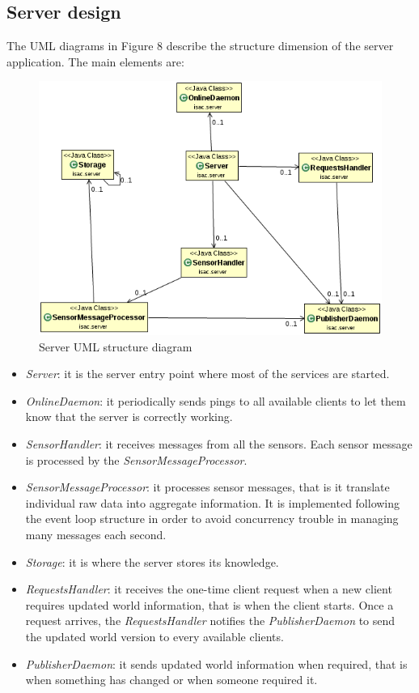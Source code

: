 \documentclass[11pt]{article}
\begin{document}
\subsection{Server design}
The UML diagrams in Figure 8 describe the structure dimension of the server application. The main elements are:
\begin{figure}
  \centering
	\includegraphics[scale=0.65]{serverUML}
  \caption{Server UML structure diagram}
\end{figure}
\begin{itemize}
\item \emph{Server}: it is the server entry point where most of the services are started.
\item \emph{OnlineDaemon}: it periodically sends pings to all available clients to let them know that the server is correctly working.
\item \emph{SensorHandler}: it receives messages from all the sensors. Each sensor message is processed by the \emph{SensorMessageProcessor}.
\item \emph{SensorMessageProcessor}: it processes sensor messages, that is it translate individual raw data into aggregate information. It is implemented following the event loop structure in order to avoid concurrency trouble in managing many messages each second.
\item \emph{Storage}: it is where the server stores its knowledge.
\item \emph{RequestsHandler}: it receives the one-time client request when a new client requires updated world information, that is when the client starts. Once a request arrives, the \emph{RequestsHandler} notifies the \emph{PublisherDaemon} to send the updated world version to every available clients.
\item \emph{PublisherDaemon}: it sends updated world information when required, that is when something has changed or when someone required it.
\end{itemize}
\end{document}
